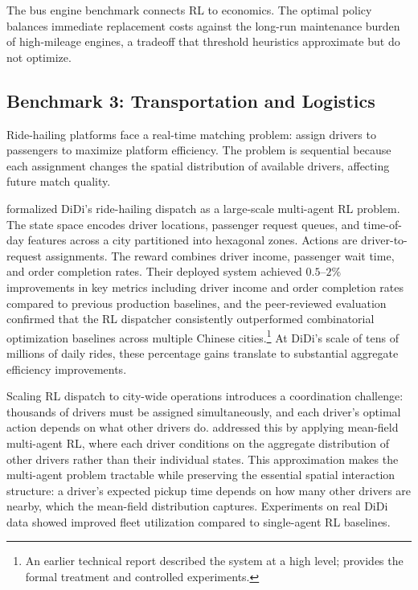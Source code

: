 \begin{table}[htbp]
\centering
\caption{Bus engine replacement benchmark results across fleet sizes $N$.}
\label{tab:bus_engine_results}
\resizebox{\textwidth}{!}{}
\end{table}

The bus engine benchmark connects RL to economics. The optimal policy balances immediate replacement costs against the long-run maintenance burden of high-mileage engines, a tradeoff that threshold heuristics approximate but do not optimize.


\subsection{Benchmark 3: Transportation and Logistics}
\label{sec:benchmark_dispatch}

Ride-hailing platforms face a real-time matching problem: assign drivers to passengers to maximize platform efficiency. The problem is sequential because each assignment changes the spatial distribution of available drivers, affecting future match quality.

\citet{Qin2021dispatch} formalized DiDi's ride-hailing dispatch as a large-scale multi-agent RL problem. The state space encodes driver locations, passenger request queues, and time-of-day features across a city partitioned into hexagonal zones. Actions are driver-to-request assignments. The reward combines driver income, passenger wait time, and order completion rates. Their deployed system achieved $0.5$--$2\%$ improvements in key metrics including driver income and order completion rates compared to previous production baselines, and the peer-reviewed evaluation confirmed that the RL dispatcher consistently outperformed combinatorial optimization baselines across multiple Chinese cities.\footnote{An earlier technical report \citep{DiDi2019} described the system at a high level; \citet{Qin2021dispatch} provides the formal treatment and controlled experiments.} At DiDi's scale of tens of millions of daily rides, these percentage gains translate to substantial aggregate efficiency improvements.

Scaling RL dispatch to city-wide operations introduces a coordination challenge: thousands of drivers must be assigned simultaneously, and each driver's optimal action depends on what other drivers do. \citet{Li2019ridesharing} addressed this by applying mean-field multi-agent RL, where each driver conditions on the aggregate distribution of other drivers rather than their individual states. This approximation makes the multi-agent problem tractable while preserving the essential spatial interaction structure: a driver's expected pickup time depends on how many other drivers are nearby, which the mean-field distribution captures. Experiments on real DiDi data showed improved fleet utilization compared to single-agent RL baselines.

